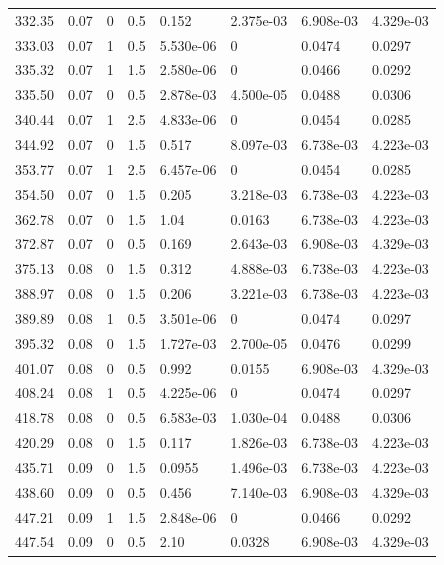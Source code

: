\documentclass[preview]{standalone}
\begin{document}
{{{\begin{tabular}{L{1.2cm}C{1.2cm} C{0.3cm}C{0.5cm} C{1.4cm}C{1.4cm} C{1.4cm}C{1.4cm}}
  332.35  &  0.07  & 0     & 0.5 &  0.152  & 2.375e-03  & 6.908e-03 &  4.329e-03   \\ 
  333.03  &  0.07  & 1     & 0.5 &  5.530e-06  & 0  & 0.0474 &  0.0297   \\ 
  335.32  &  0.07  & 1     & 1.5 &  2.580e-06  & 0  & 0.0466 &  0.0292   \\ 
  335.50  &  0.07  & 0     & 0.5 &  2.878e-03  & 4.500e-05  & 0.0488 &  0.0306   \\ 
  340.44  &  0.07  & 1     & 2.5 &  4.833e-06  & 0  & 0.0454 &  0.0285   \\ 
  344.92  &  0.07  & 0     & 1.5 &  0.517  & 8.097e-03  & 6.738e-03 &  4.223e-03   \\ 
  353.77  &  0.07  & 1     & 2.5 &  6.457e-06  & 0  & 0.0454 &  0.0285   \\ 
  354.50  &  0.07  & 0     & 1.5 &  0.205  & 3.218e-03  & 6.738e-03 &  4.223e-03   \\ 
  362.78  &  0.07  & 0     & 1.5 &  1.04  & 0.0163  & 6.738e-03 &  4.223e-03   \\ 
  372.87  &  0.07  & 0     & 0.5 &  0.169  & 2.643e-03  & 6.908e-03 &  4.329e-03   \\ 
  375.13  &  0.08  & 0     & 1.5 &  0.312  & 4.888e-03  & 6.738e-03 &  4.223e-03   \\ 
  388.97  &  0.08  & 0     & 1.5 &  0.206  & 3.221e-03  & 6.738e-03 &  4.223e-03   \\ 
  389.89  &  0.08  & 1     & 0.5 &  3.501e-06  & 0  & 0.0474 &  0.0297   \\ 
  395.32  &  0.08  & 0     & 1.5 &  1.727e-03  & 2.700e-05  & 0.0476 &  0.0299   \\ 
  401.07  &  0.08  & 0     & 0.5 &  0.992  & 0.0155  & 6.908e-03 &  4.329e-03   \\ 
  408.24  &  0.08  & 1     & 0.5 &  4.225e-06  & 0  & 0.0474 &  0.0297   \\ 
  418.78  &  0.08  & 0     & 0.5 &  6.583e-03  & 1.030e-04  & 0.0488 &  0.0306   \\ 
  420.29  &  0.08  & 0     & 1.5 &  0.117  & 1.826e-03  & 6.738e-03 &  4.223e-03   \\ 
  435.71  &  0.09  & 0     & 1.5 &  0.0955  & 1.496e-03  & 6.738e-03 &  4.223e-03   \\ 
  438.60  &  0.09  & 0     & 0.5 &  0.456  & 7.140e-03  & 6.908e-03 &  4.329e-03   \\ 
  447.21  &  0.09  & 1     & 1.5 &  2.848e-06  & 0  & 0.0466 &  0.0292   \\ 
  447.54  &  0.09  & 0     & 0.5 &  2.10  & 0.0328  & 6.908e-03 &  4.329e-03   \\ 

\end{tabular}}}}
\end{document}
